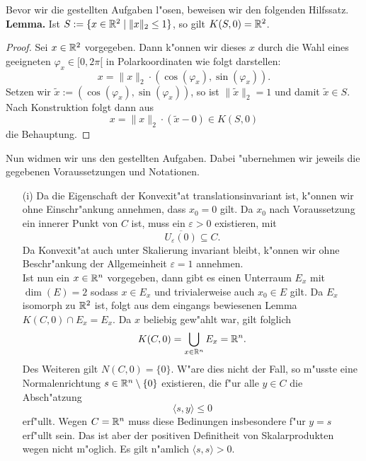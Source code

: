 \newcommand{\e}{\varepsilon}

Bevor wir die gestellten Aufgaben l"osen, beweisen wir den folgenden Hilfssatz.\\

\textbf{Lemma.} Ist $S:=\{x\in\mathbb{R}^2 \mid \|x\|_2 \le 1\}$, so gilt $K(S,0)=\mathbb{R}^2$.

\begin{proof}
Sei $x\in\mathbb{R}^2$ vorgegeben. Dann k"onnen wir dieses $x$ durch die Wahl eines
geeigneten $\varphi_x \in [0,2\pi[$ in Polarkoordinaten wie folgt darstellen:
\[
x = \|x\|_2 \cdot (\cos(\varphi_x), \sin(\varphi_x)).
\]
Setzen wir $\widetilde{x} := (\cos(\varphi_x), \sin(\varphi_x))$, so ist $\|\widetilde{x}\|_2 = 1$
und damit $\widetilde{x} \in S$. Nach Konstruktion folgt dann aus
\[
x = \|x\|_2\cdot(\widetilde{x}-0) \in K(S,0)
\]
die Behauptung.
\end{proof}

Nun widmen wir uns den gestellten Aufgaben. Dabei "ubernehmen wir jeweils die
gegebenen Voraussetzungen und Notationen.

\begin{itemize}
\item [(i)]
Da die Eigenschaft der Konvexit"at translationsinvariant
ist, k"onnen wir ohne Einschr"ankung annehmen, dass $x_0 = 0$ gilt. Da $x_0$
nach Voraussetzung ein innerer Punkt von $C$ ist, muss ein $\e > 0$ existieren,
mit
\[
\overline{U_\e (0)} \subseteq C.
\]
Da Konvexit"at auch unter Skalierung invariant bleibt, k"onnen wir ohne Beschr"ankung
der Allgemeinheit $\e = 1$ annehmen.\\

Ist nun ein $x\in\mathbb{R}^n$ vorgegeben, dann gibt es einen Unterraum $E_x$ mit $\dim(E)=2$
sodass $x \in E_x$ und trivialerweise auch $x_0 \in E$ gilt. Da $E_x$ isomorph zu $\mathbb{R}^2$
ist, folgt aus dem eingangs bewiesenen Lemma $K(C,0)\cap E_x = E_x$. Da $x$ beliebig
gew"ahlt war, gilt folglich
\[
K(C,0) = \bigcup_{x\in\mathbb{R}^n} E_x = \mathbb{R}^n.
\]
Des Weiteren gilt $N(C,0) = \{0\}$. W"are dies nicht der Fall, so m"usste eine
Normalenrichtung $s\in\mathbb{R}^n\setminus\{0\}$ existieren, die f"ur alle $y\in C$ die Absch"atzung
\[
\langle s, y \rangle \le 0
\]
erf"ullt. Wegen $C = \mathbb{R}^n$ muss diese Bedinungen insbesondere f"ur $y = s$ erf"ullt
sein. Das ist aber der positiven Definitheit von Skalarprodukten wegen nicht m"oglich.
Es gilt n"amlich $\langle s,s \rangle > 0$.
\end{itemize}
